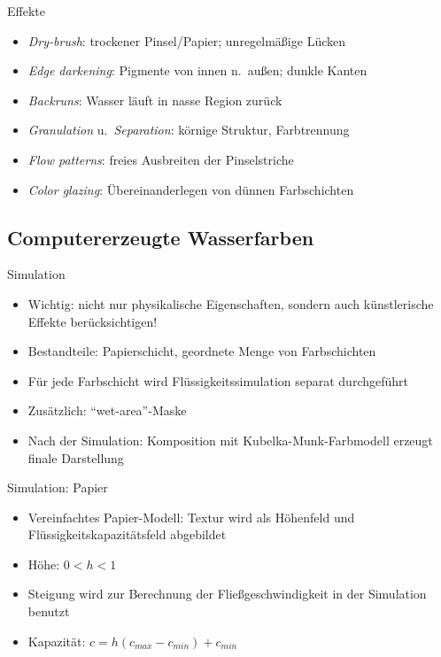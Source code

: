 \begin{frame}{Effekte}
  \centering{}
  
  \begin{itemize}
    \item \textsl{Dry-brush}: trockener Pinsel/Papier; unregelmäßige Lücken
    \item \textsl{Edge darkening}: Pigmente von innen n.\ außen; dunkle Kanten
    \item \textsl{Backruns}: Wasser läuft in nasse Region zurück
    \item \textsl{Granulation} u.\ \textsl{Separation}: körnige Struktur, Farbtrennung
    \item \textsl{Flow patterns}: freies Ausbreiten der Pinselstriche
    \item \textsl{Color glazing}: Übereinanderlegen von dünnen Farbschichten
  \end{itemize}
\end{frame}

\subsection{Computererzeugte Wasserfarben}
\begin{frame}{Simulation}
  \begin{itemize}
    \item Wichtig: nicht nur physikalische Eigenschaften, sondern auch
    künstlerische Effekte berücksichtigen!
    \item Bestandteile: Papierschicht, geordnete Menge von Farbschichten
    \item Für jede Farbschicht wird Flüssigkeitssimulation separat durchgeführt
    \item Zusätzlich: "`wet-area"'-Maske
    \item Nach der Simulation: Komposition mit Kubelka-Munk-Farbmodell erzeugt 
    finale Darstellung
  \end{itemize}
\end{frame}

\begin{frame}{Simulation: Papier}
  \begin{itemize}
    \item Vereinfachtes Papier-Modell: Textur wird als Höhenfeld und
    Flüssigkeitskapazitätsfeld abgebildet
    \item Höhe: $0 < h < 1$
    \item Steigung wird zur Berechnung der Fließgeschwindigkeit in der
    Simulation benutzt
    \item Kapazität: $c = h(c_{max} - c_{min}) + c_{min}$
  \end{itemize}
\end{frame}


